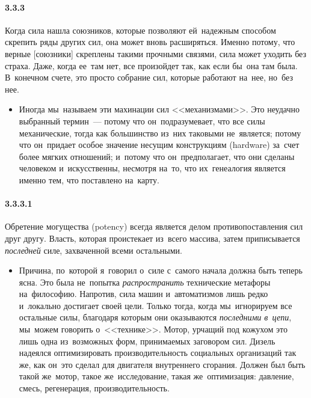 \paragraph{3.3.3}\hypertarget{par:3.3.3}{} Когда сила нашла союзников, которые позволяют ей~надежным способом скрепить ряды других сил, она может вновь расширяться. Именно потому, что верные [союзники] скреплены такими прочными связями, сила может уходить без страха. Даже, когда ее~там нет, все произойдет так, как если бы~она там была. В~конечном счете, это просто собрание сил, которые работают на~нее, но~без нее.
	\begin{itemize}
	\item 
	Иногда мы~называем эти махинации сил <<механизмами>>. Это неудачно выбранный термин~--- потому что он~подразумевает, что все силы механические, тогда как большинство из~них таковыми не~является; потому что он~придает особое значение несущим конструкциям (hardware) за~счет более мягких отношений; и~потому что он~предполагает, что они сделаны человеком и~искусственны, несмотря на~то, что их~генеалогия является именно тем, что поставлено на~карту.
	\end{itemize}

\paragraph{3.3.3.1}\hypertarget{par:3.3.3.1}{} Обретение могущества (potency) всегда является делом противопоставления сил друг другу. Власть, которая проистекает из~всего массива, затем приписывается {\itshape последней} силе, захваченной всеми остальными. 
	\begin{itemize}
	\item 
	Причина, по~которой я~говорил о~силе с~самого начала должна быть теперь ясна. Это была не~попытка {\itshape распространить} технические метафоры на~философию. Напротив, сила машин и~автоматизмов лишь редко и~локально достигает своей цели. Только тогда, когда мы~игнорируем все остальные силы, благодаря которым они оказываются {\itshape последними в~цепи}, мы~можем говорить о~<<технике>>. Мотор, урчащий под кожухом это лишь одна из~возможных форм, принимаемых заговором сил. Дизель надеялся оптимизировать производительность социальных организаций так же, как он~это сделал для двигателя внутреннего сгорания. Должен был быть такой же~мотор, такое же~исследование, такая же~оптимизация: давление, смесь, регенерация, производительность.
	\end{itemize}

